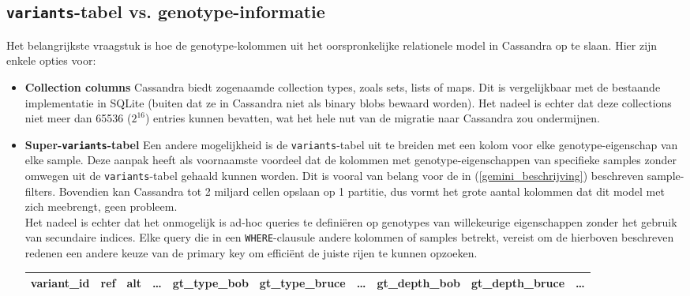 \subsection{\texttt{variants}-tabel vs. genotype-informatie}

Het belangrijkste vraagstuk is hoe de genotype-kolommen uit het oorspronkelijke relationele model in Cassandra op te slaan. Hier zijn enkele opties voor:

\begin{itemize}

\item \textbf{Collection columns} Cassandra biedt zogenaamde collection types, zoals sets, lists of maps. Dit is vergelijkbaar met de bestaande implementatie in SQLite (buiten dat ze in Cassandra niet als binary blobs bewaard worden). Het nadeel is echter dat deze collections niet meer dan 65536 ($2^{16}$) entries kunnen bevatten, wat het hele nut van de migratie naar Cassandra zou ondermijnen.

\item \textbf{Super-\texttt{variants}-tabel} Een andere mogelijkheid is de \texttt{variants}-tabel uit te breiden met een kolom voor elke genotype-eigenschap van elke sample. Deze aanpak heeft als voornaamste voordeel dat de kolommen met genotype-eigenschappen van specifieke samples zonder omwegen uit de \texttt{variants}-tabel gehaald kunnen worden. Dit is vooral van belang voor de in (\ref{gemini_beschrijving}) beschreven sample-filters. Bovendien kan Cassandra tot 2 miljard cellen opslaan op 1 partitie, dus vormt het grote aantal kolommen dat dit model met zich meebrengt, geen probleem.\\
Het nadeel is echter dat het onmogelijk is ad-hoc queries te defini\"eren op genotypes van willekeurige eigenschappen zonder het gebruik van secundaire indices. Elke query die in een \texttt{WHERE}-clausule andere kolommen of samples betrekt, vereist om de hierboven beschreven redenen een andere keuze van de primary key om effici\"ent de juiste rijen te kunnen opzoeken.

\begin{table}[!htbp]
\begin{tabular}{@{}|l|l|l|l|l|l|l|l|l|l|@{}}
\toprule
variant\_id & ref & alt & \ldots & gt\_type\_bob & gt\_type\_bruce & \ldots & gt\_depth\_bob & gt\_depth\_bruce & \ldots \\ \bottomrule
\end{tabular}
\end{table}


\end{itemize}
